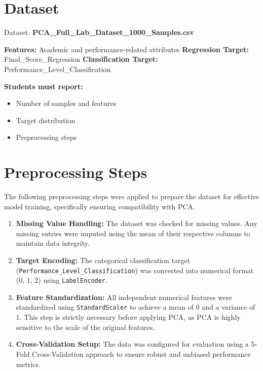 \documentclass[11pt]{article}
\begin{document}
\section*{Dataset}

Dataset: \textbf{PCA\_Full\_Lab\_Dataset\_1000\_Samples.csv}

\textbf{Features:} Academic and performance-related attributes  
\textbf{Regression Target:} Final\_Score\_Regression  
\textbf{Classification Target:} Performance\_Level\_Classification  

\textbf{Students must report:}
\begin{itemize}
    \item Number of samples and features
    \item Target distribution
    \item Preprocessing steps
\end{itemize}

\section*{Preprocessing Steps}

The following preprocessing steps were applied to prepare the dataset for effective model training, specifically ensuring compatibility with PCA.

\begin{enumerate}
    \item \textbf{Missing Value Handling:} The dataset was checked for missing values. Any missing entries were imputed using the mean of their respective columns to maintain data integrity.

    \item \textbf{Target Encoding:} The categorical classification target (\texttt{Performance\_Level\_Classification}) was converted into numerical format (0, 1, 2) using \texttt{LabelEncoder}.

    \item \textbf{Feature Standardization:} All independent numerical features were standardized using \texttt{StandardScaler} to achieve a mean of 0 and a variance of 1. This step is strictly necessary before applying PCA, as PCA is highly sensitive to the scale of the original features.

    \item \textbf{Cross-Validation Setup:} The data was configured for evaluation using a 5-Fold Cross-Validation approach to ensure robust and unbiased performance metrics.
\end{enumerate}
\end{document}
